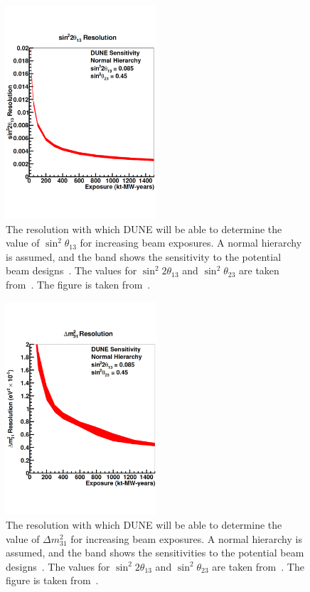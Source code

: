 \begin{figure}
  \centering
  \includegraphics[width=0.5\textwidth]{DUNETheta13Res}
  \caption[The resolution with which DUNE will be able to determine the value of $\sin^{2}\theta_{13}$ for increasing beam exposures]
          {The resolution with which DUNE will be able to determine the value of $\sin^{2}\theta_{13}$ for increasing beam exposures. A normal hierarchy is assumed, and the band shows the sensitivity to the potential beam designs~\citep{DUNECDR_V3}. The values for $\sin^{2}2\theta_{13}$ and $\sin^{2}\theta_{23}$ are taken from~\citep{NuFit2014}. The figure is taken from~\citep{DUNECDR_V2}.}
  \label{fig:DUNETheta13Res}
\end{figure}

\begin{figure}
  \centering
  \includegraphics[width=0.5\textwidth]{DUNEDeltaMRes}
  \caption[The resolution with which DUNE will be able to determine the value of $\Delta m^{2}_{31}$ for increasing beam exposures]
          {The resolution with which DUNE will be able to determine the value of $\Delta m^{2}_{31}$ for increasing beam exposures. A normal hierarchy is assumed, and the band shows the sensitivities to the potential beam designs~\citep{DUNECDR_V3}. The values for $\sin^{2}2\theta_{13}$ and $\sin^{2}\theta_{23}$ are taken from~\citep{NuFit2014}. The figure is taken from~\citep{DUNECDR_V2}.}
  \label{fig:DUNEDeltaMRes}
\end{figure}

